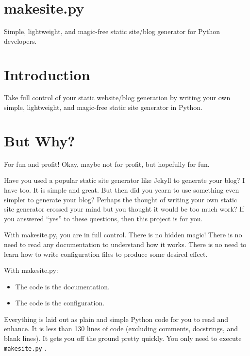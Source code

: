\documentclass[a0]{a0poster}
\newcommand{\inlinecode}[1]{%
    \lstinline{#1}%
}
\begin{document}
\begin{multicols}{4}
    \Large
    \color{Navy}
    \section*{makesite.py}
    Simple, lightweight, and magic-free static site/blog generator for
    Python developers.


    \color{SaddleBrown}
    \section*{Introduction}
    Take full control of your static website/blog generation by writing
    your own simple, lightweight, and magic-free static site generator
    in Python.


    \color{DarkSlateGray}
    \section*{But Why?}
    For fun and profit! Okay, maybe not for profit, but hopefully for
    fun.

    Have you used a popular static site generator like Jekyll to
    generate your blog? I have too. It is simple and great. But then did
    you yearn to use something even simpler to generate your blog?
    Perhaps the thought of writing your own static site generator
    crossed your mind but you thought it would be too much work? If you
    answered ``yes'' to these questions, then this project is for you.

    With makesite.py, you are in full control. There is no hidden magic!
    There is no need to read any documentation to understand how it
    works. There is no need to learn how to write configuration files to
    produce some desired effect.

    With makesite.py:

    \begin{itemize}
        \item
        The code is the documentation.
        \item
        The code is the configuration.
    \end{itemize}

    Everything is laid out as plain and simple Python code for you to
    read and enhance. It is less than 130 lines of code (excluding
    comments, docstrings, and blank lines). It gets you off the ground
    pretty quickly. You only need to execute \inlinecode{makesite.py}.


\end{multicols}
\end{document}
